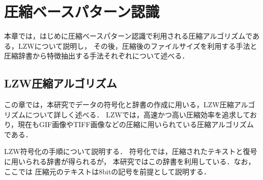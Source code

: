 \chapter{圧縮ベースパターン認識}
本章では，はじめに圧縮ベースパターン認識で利用される圧縮アルゴリズムである，LZWについて説明し，
その後，圧縮後のファイルサイズを利用する手法と圧縮辞書から特徴抽出する手法それぞれについて述べる．


\section{LZW圧縮アルゴリズム}
この章では，本研究でデータの符号化と辞書の作成に用いる，LZW圧縮アルゴリズムについて詳しく述べる．
LZWでは，高速かつ高い圧縮効率を追求しており，現在もGIF画像やTIFF画像などの圧縮に用いられている圧縮アルゴリズムである．

LZW符号化の手順について説明する．
符号化では，圧縮されたテキストと復号に用いられる辞書が得られるが，
本研究ではこの辞書を利用している．なお，ここでは
圧縮元のテキストは8bitの記号を前提として説明する．

\begin{table}[tb]%
\caption{初期状態のLZW辞書．}
\label{lz}
\begin{center}
\end{center}
\end{table}

